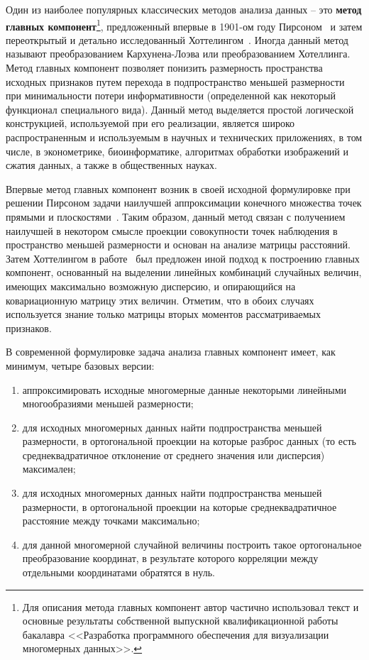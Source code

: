 \documentclass[a4paper,12pt,russian]{article} %
\begin{document}
Один из наиболее популярных классических методов анализа данных -- это \textbf{метод главных компонент}\footnote{
	Для описания метода главных компонент автор частично использовал текст и основные результаты собственной выпускной квалификационной работы бакалавра <<Разработка программного обеспечения для визуализации многомерных данных>>.
},
предложенный впервые в 1901-ом году Пирсоном~\cite{PCAorigin_pearson1901} и затем переоткрытый и детально исследованный Хоттелингом~\cite{PCAorigin_hotelling1933}.
Иногда данный метод называют преобразованием Кархунена-Лоэва или преобразованием Хотеллинга.
Метод главных компонент позволяет понизить размерность пространства исходных признаков путем перехода в подпространство меньшей размерности при минимальности потери информативности (определенной как некоторый функционал специального вида).
Данный метод выделяется простой логической конструкцией, используемой при его реализации, является широко распространенным и используемым в научных и технических приложениях, в том числе, в эконометрике, биоинформатике, алгоритмах обработки изображений и сжатия данных, а также в общественных науках.
	
Впервые метод главных компонент возник в своей исходной формулировке при решении Пирсоном задачи наилучшей аппроксимации конечного множества точек прямыми и плоскостями~\cite{PCAorigin_pearson1901}.
Таким образом, данный метод связан с получением наилучшей в некотором смысле проекции совокупности точек наблюдения в пространство меньшей размерности и основан на анализе матрицы расстояний.
Затем Хоттелингом в работе~\cite{PCAorigin_hotelling1933} был предложен иной подход к построению главных компонент, основанный на выделении линейных комбинаций случайных величин, имеющих максимально возможную дисперсию, и опирающийся на ковариационную матрицу этих величин.
Отметим, что в обоих случаях используется знание только матрицы вторых моментов рассматриваемых признаков.

В современной формулировке задача анализа главных компонент имеет, как минимум, четыре базовых версии:
\begin{enumerate}
	\item аппроксимировать исходные многомерные данные некоторыми линейными многообразиями меньшей размерности;
	\item для исходных многомерных данных найти подпространства меньшей размерности, в ортогональной проекции на которые разброс данных (то есть среднеквадратичное отклонение от среднего значения или дисперсия) максимален;
	\item для исходных многомерных данных найти подпространства меньшей размерности, в ортогональной проекции на которые среднеквадратичное расстояние между точками максимально;
	\item для данной многомерной случайной величины построить такое ортогональное преобразование координат, в результате которого корреляции между отдельными координатами обратятся в нуль.
\end{enumerate}
\end{document}
